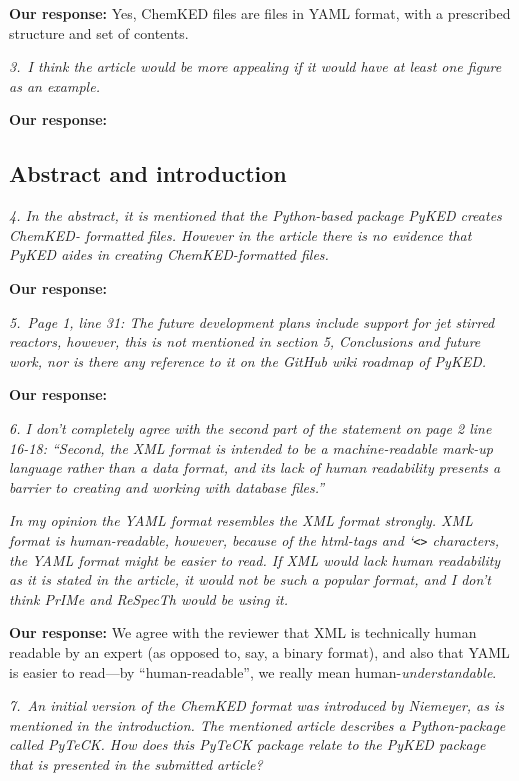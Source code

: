 \documentclass[a4paper,10pt]{elsarticle}
\begin{document}
\textbf{Our response:}
Yes, ChemKED files are files in YAML format, with a prescribed structure and set of contents.

\textit{3.~I think the article would be more appealing if it would have at least one figure as an example.}

\textbf{Our response:}


\subsection*{Abstract and introduction}
\textit{4. In the abstract, it is mentioned that the Python-based package PyKED creates ChemKED- formatted files. However in the article there is no evidence that PyKED aides in creating ChemKED-formatted files.}

\textbf{Our response:}


\textit{5.~Page 1, line 31: The future development plans include support for jet stirred reactors, however, this is not mentioned in section 5, Conclusions and future work, nor is there any reference to it on the GitHub wiki roadmap of PyKED.}

\textbf{Our response:}

\textit{6. I don't completely agree with the second part of the statement on page 2 line 16-18: ``Second, the XML format is intended to be a machine-readable mark-up language rather than a data format, and its lack of human readability presents a barrier to creating and working with database files.''}

\textit{In my opinion the YAML format resembles the XML format strongly. XML format is human-readable, however, because of the html-tags and `\texttt{<>} characters, the YAML format might be easier to read. If XML would lack human readability as it is stated in the article, it would not be such a popular format, and I don't think PrIMe and ReSpecTh would be using it.}

\textbf{Our response:}
We agree with the reviewer that XML is technically human readable by an expert (as opposed to, say, a binary format), and also that YAML is easier to read---by ``human-readable'', we really mean human-\emph{understandable}.


\textit{7.~An initial version of the ChemKED format was introduced by Niemeyer, as is mentioned in the introduction. The mentioned article describes a Python-package called PyTeCK. How does this PyTeCK package relate to the PyKED package that is presented in the submitted article?}
\end{document}
